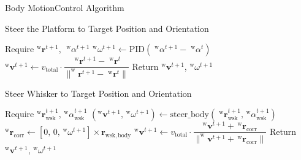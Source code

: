 \documentclass[AIRbeamer
,optEnglish
,optBiber
,optBibstyleAlphabetic
,optBeamerClassicFormat%
]{AIRlatex}
\begin{document}
    \begin{frame}{Body Motion}{Control Algorithm}
        \begin{algorithm}[H]
            \caption{Steer the Platform to Target Position and Orientation}
            \begin{algorithmic}[1]
                \State Require \(^{\mathrm{w}}\boldsymbol{r}^{t+1}\), \(\;^{\mathrm{w}}\alpha^{t+1}\)
                \State \(^{\mathrm{w}}\omega^{t+1} \gets \mathrm{PID}(\;^{\mathrm{w}}\alpha^{t+1} - \;^{\mathrm{w}}\alpha^{t})\)
                \State \(^{\mathrm{w}}\boldsymbol{v}^{t+1} \gets v_{\mathrm{total}} \cdot \dfrac{\;^{\mathrm{w}}\boldsymbol{r}^{t+1} - \;^{\mathrm{w}}\boldsymbol{r}^{t}}{\|^{\mathrm{w}}\boldsymbol{r}^{t+1} - \;^{\mathrm{w}}\boldsymbol{r}^{t}\|}\)
                \State Return \(^{\mathrm{w}}\boldsymbol{v}^{t+1}\), \(^{\mathrm{w}}\omega^{t+1}\)
            \end{algorithmic}
            \label{alg:steer_platform}
        \end{algorithm}

        \begin{algorithm}[H]
            \caption{Steer Whisker to Target Position and Orientation}
            \begin{algorithmic}[1]
                \State Require \(^{\mathrm{w}}\boldsymbol{r}_{\mathrm{wsk}}^{t+1}\), \(^{\mathrm{w}}\alpha_{\mathrm{wsk}}^{t+1}\)
                \State \((^{\mathrm{w}}\boldsymbol{v}^{t+1},\, ^{\mathrm{w}}\omega^{t+1}) \gets \mathrm{steer\_body}(\;^{\mathrm{w}}\boldsymbol{r}_{\mathrm{wsk}}^{t+1},\, ^{\mathrm{w}}\alpha_{\mathrm{wsk}}^{t+1})\)
                \State \(^{\mathrm{w}}\boldsymbol{r}_{\mathrm{corr}} \gets [0,\,0,\,^{\mathrm{w}}\omega^{t+1}] \times \boldsymbol{r}_{\mathrm{wsk, body}}\)
                \State \(^{\mathrm{w}}\boldsymbol{v}^{t+1} \gets v_{\mathrm{total}} \cdot \dfrac{^{\mathrm{w}}\boldsymbol{v}^{t+1} + \,^{\mathrm{w}}\boldsymbol{r}_{\mathrm{corr}}}{\|^{\mathrm{w}}\boldsymbol{v}^{t+1} + \,^{\mathrm{w}}\boldsymbol{r}_{\mathrm{corr}}\|}\)
                \State Return \(^{\mathrm{w}}\boldsymbol{v}^{t+1}\), \(^{\mathrm{w}}\omega^{t+1}\)
            \end{algorithmic}
            \label{alg:steer_whisker}
        \end{algorithm}

    \end{frame}
\end{document}
